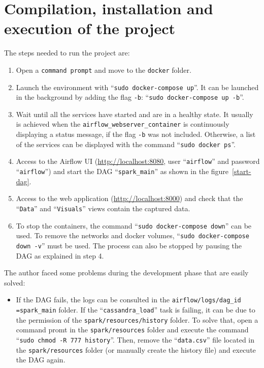 \section{Compilation, installation and execution of the project} \label{programmer_execute}
\nonzeroparskip The steps needed to run the project are:
\begin{enumerate}
	\item Open a \texttt{command prompt} and move to the \texttt{docker} folder.
	\item Launch the environment with ``\texttt{sudo docker-compose up}''. It can be launched in the background by adding the flag \texttt{-b}: ``\texttt{sudo docker-compose up -b}''.
	\item Wait until all the services have started and are in a healthy state. It usually is achieved when the \texttt{airflow\_webserver\_container} is continuously displaying a status message, if the flag \texttt{-b} was not included. Otherwise, a list of the services can be displayed with the command ``\texttt{sudo docker ps}''.
	\item Access to the Airflow UI (\url{http://localhost:8080}, user ``\texttt{airflow}'' and password ``\texttt{airflow}'') and start the DAG ``\texttt{spark\_main}'' as shown in the figure~\ref{start-dag}.
	\item Access to the web application (\url{http://localhost:8000}) and check that the ``\texttt{Data}'' and ``\texttt{Visuals}'' views contain the captured data.
	\item To stop the containers, the command ``\texttt{sudo docker-compose down}'' can be used. To remove the networks and docker volumes, ``\texttt{sudo docker-compose down -v}'' must be used. The process can also be stopped by pausing the DAG as explained in step 4.
\end{enumerate}


\nonzeroparskip The author faced some problems during the development phase that are easily solved:
\begin{itemize}
	\item If the DAG fails, the logs can be consulted in the \texttt{airflow/logs/dag\_id =spark\_main} folder. If the ``\texttt{cassandra\_load}'' task is failing, it can be due to the permission of the \texttt{spark/resources/history} folder. To solve that, open a command promt in the \texttt{spark/resources} folder and execute the command ``\texttt{sudo chmod -R 777 history}''. Then, remove the ``\texttt{data.csv}'' file located in the \texttt{spark/resources} folder (or manually create the history file) and execute the DAG again.
\end{itemize}

